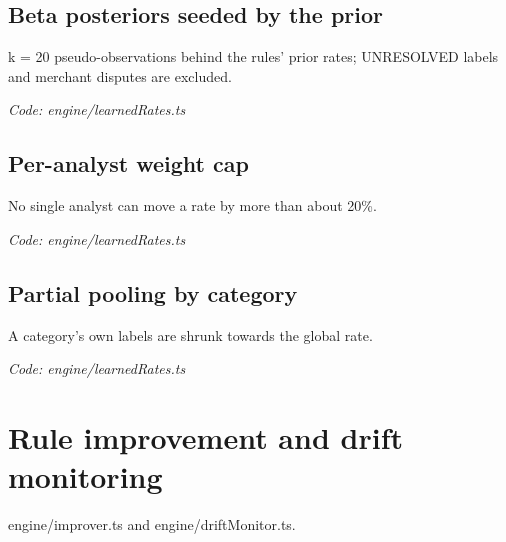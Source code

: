 \documentclass[11pt,a4paper]{article}
\newcommand{\where}[1]{\par{\small\itshape\color{mute}Code: #1}\par}
\begin{document}
\subsection*{Beta posteriors seeded by the prior}
\par\smallskip\noindent{}\par\smallskip
\par\smallskip\noindent{}\par\smallskip
k = 20 pseudo-observations behind the rules' prior rates; UNRESOLVED labels and merchant disputes are excluded.
\where{engine/learnedRates.ts}

\subsection*{Per-analyst weight cap}
\par\smallskip\noindent{}\par\smallskip
No single analyst can move a rate by more than about 20\%.
\where{engine/learnedRates.ts}

\subsection*{Partial pooling by category}
\par\smallskip\noindent{}\par\smallskip
A category's own labels are shrunk towards the global rate.
\where{engine/learnedRates.ts}

\clearpage
\section{Rule improvement and drift monitoring}
{\color{mute}engine/improver.ts and engine/driftMonitor.ts.}
\end{document}
